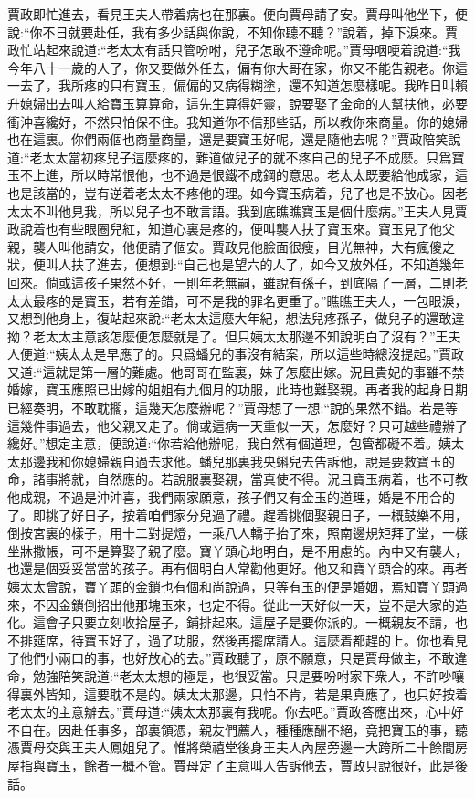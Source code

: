 \begin{parag}
    賈政即忙進去，看見王夫人帶着病也在那裏。便向賈母請了安。賈母叫他坐下，便說:“你不日就要赴任，我有多少話與你說，不知你聽不聽？”說着，掉下淚來。賈政忙站起來說道:“老太太有話只管吩咐，兒子怎敢不遵命呢。”賈母咽哽着說道:“我今年八十一歲的人了，你又要做外任去，偏有你大哥在家，你又不能告親老。你這一去了，我所疼的只有寶玉，偏偏的又病得糊塗，還不知道怎麼樣呢。我昨日叫賴升媳婦出去叫人給寶玉算算命，這先生算得好靈，說要娶了金命的人幫扶他，必要衝沖喜纔好，不然只怕保不住。我知道你不信那些話，所以教你來商量。你的媳婦也在這裏。你們兩個也商量商量，還是要寶玉好呢，還是隨他去呢？”賈政陪笑說道:“老太太當初疼兒子這麼疼的，難道做兒子的就不疼自己的兒子不成麼。只爲寶玉不上進，所以時常恨他，也不過是恨鐵不成鋼的意思。老太太既要給他成家，這也是該當的，豈有逆着老太太不疼他的理。如今寶玉病着，兒子也是不放心。因老太太不叫他見我，所以兒子也不敢言語。我到底瞧瞧寶玉是個什麼病。”王夫人見賈政說着也有些眼圈兒紅，知道心裏是疼的，便叫襲人扶了寶玉來。寶玉見了他父親，襲人叫他請安，他便請了個安。賈政見他臉面很瘦，目光無神，大有瘋傻之狀，便叫人扶了進去，便想到:“自己也是望六的人了，如今又放外任，不知道幾年回來。倘或這孩子果然不好，一則年老無嗣，雖說有孫子，到底隔了一層，二則老太太最疼的是寶玉，若有差錯，可不是我的罪名更重了。”瞧瞧王夫人，一包眼淚，又想到他身上，復站起來說:“老太太這麼大年紀，想法兒疼孫子，做兒子的還敢違拗？老太太主意該怎麼便怎麼就是了。但只姨太太那邊不知說明白了沒有？”王夫人便道:“姨太太是早應了的。只爲蟠兒的事沒有結案，所以這些時總沒提起。”賈政又道:“這就是第一層的難處。他哥哥在監裏，妹子怎麼出嫁。況且貴妃的事雖不禁婚嫁，寶玉應照已出嫁的姐姐有九個月的功服，此時也難娶親。再者我的起身日期已經奏明，不敢耽擱，這幾天怎麼辦呢？”賈母想了一想:“說的果然不錯。若是等這幾件事過去，他父親又走了。倘或這病一天重似一天，怎麼好？只可越些禮辦了纔好。”想定主意，便說道:“你若給他辦呢，我自然有個道理，包管都礙不着。姨太太那邊我和你媳婦親自過去求他。蟠兒那裏我央蝌兒去告訴他，說是要救寶玉的命，諸事將就，自然應的。若說服裏娶親，當真使不得。況且寶玉病着，也不可教他成親，不過是沖沖喜，我們兩家願意，孩子們又有金玉的道理，婚是不用合的了。即挑了好日子，按着咱們家分兒過了禮。趕着挑個娶親日子，一概鼓樂不用，倒按宮裏的樣子，用十二對提燈，一乘八人轎子抬了來，照南邊規矩拜了堂，一樣坐牀撒帳，可不是算娶了親了麼。寶丫頭心地明白，是不用慮的。內中又有襲人，也還是個妥妥當當的孩子。再有個明白人常勸他更好。他又和寶丫頭合的來。再者姨太太曾說，寶丫頭的金鎖也有個和尚說過，只等有玉的便是婚姻，焉知寶丫頭過來，不因金鎖倒招出他那塊玉來，也定不得。從此一天好似一天，豈不是大家的造化。這會子只要立刻收拾屋子，鋪排起來。這屋子是要你派的。一概親友不請，也不排筵席，待寶玉好了，過了功服，然後再擺席請人。這麼着都趕的上。你也看見了他們小兩口的事，也好放心的去。”賈政聽了，原不願意，只是賈母做主，不敢違命，勉強陪笑說道:“老太太想的極是，也很妥當。只是要吩咐家下衆人，不許吵嚷得裏外皆知，這要耽不是的。姨太太那邊，只怕不肯，若是果真應了，也只好按着老太太的主意辦去。”賈母道:“姨太太那裏有我呢。你去吧。”賈政答應出來，心中好不自在。因赴任事多，部裏領憑，親友們薦人，種種應酬不絕，竟把寶玉的事，聽憑賈母交與王夫人鳳姐兒了。惟將榮禧堂後身王夫人內屋旁邊一大跨所二十餘間房屋指與寶玉，餘者一概不管。賈母定了主意叫人告訴他去，賈政只說很好，此是後話。
\end{parag}


